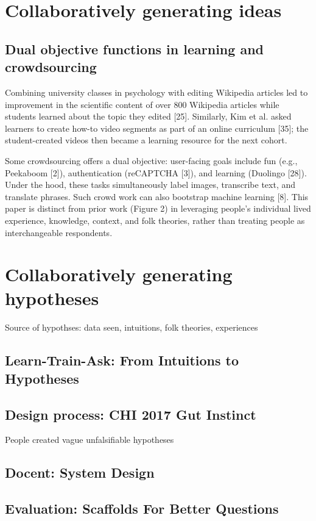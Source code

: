 \chapter{Collaboratively generating ideas}

\section{Dual objective functions in learning and crowdsourcing}
Combining university classes in psychology with editing
Wikipedia articles led to improvement in the scientific
content of over 800 Wikipedia articles while students
learned about the topic they edited [25]. Similarly, Kim et
al. asked learners to create how-to video segments as part
of an online curriculum [35]; the student-created videos
then became a learning resource for the next cohort. 

Some crowdsourcing offers a dual objective: user-facing
goals include fun (e.g., Peekaboom [2]), authentication
(reCAPTCHA [3]), and learning (Duolingo [28]). Under the
hood, these tasks simultaneously label images, transcribe
text, and translate phrases. Such crowd work can also bootstrap machine learning [8]. This paper is distinct from prior
work (Figure 2) in leveraging people’s individual lived
experience, knowledge, context, and folk theories, rather
than treating people as interchangeable respondents.


\chapter{Collaboratively generating hypotheses}
Source of hypothses: data seen, intuitions, folk theories, experiences

\section{Learn-Train-Ask: From Intuitions to Hypotheses}
\section{Design process: CHI 2017 Gut Instinct}
People created vague unfalsifiable hypotheses

\section{Docent: System Design}
\section{Evaluation: Scaffolds For Better Questions}
